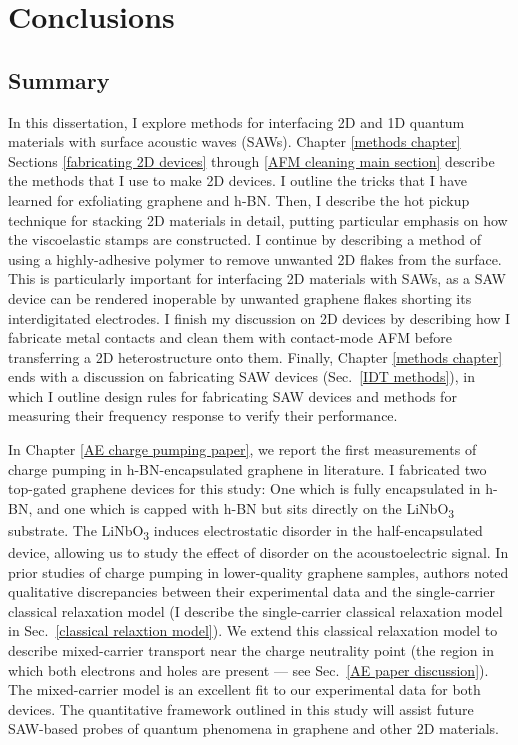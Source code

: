 \documentclass[double,12pt,1in,seploa]{beavtex}
\let\Oldsection\section
\renewcommand{\section}{\FloatBarrier\Oldsection}
\begin{document}
\chapter{Conclusions} \label{conclusions chapter}

\section{Summary}
In this dissertation, I explore methods for interfacing 2D and 1D quantum materials with surface acoustic waves (SAWs). Chapter \ref{methods chapter} Sections \ref{fabricating 2D devices} through \ref{AFM cleaning main section} describe the methods that I use to make 2D devices. I outline the tricks that I have learned for exfoliating graphene and h-BN. Then, I describe the hot pickup technique for stacking 2D materials in detail, putting particular emphasis on how the viscoelastic stamps are constructed. I continue by describing a method of using a highly-adhesive polymer to remove unwanted 2D flakes from the surface. This is particularly important for interfacing 2D materials with SAWs, as a SAW device can be rendered inoperable by unwanted graphene flakes shorting its interdigitated electrodes. I finish my discussion on 2D devices by describing how I fabricate metal contacts and clean them with contact-mode AFM before transferring a 2D heterostructure onto them. Finally, Chapter \ref{methods chapter} ends with a discussion on fabricating SAW devices (Sec.\ \ref{IDT methods}), in which I outline design rules for fabricating SAW devices and methods for measuring their frequency response to verify their performance.

In Chapter \ref{AE charge pumping paper}, we report the first measurements of charge pumping in h-BN-encapsulated graphene in literature. I fabricated two top-gated graphene devices for this study: One which is fully encapsulated in h-BN, and one which is capped with h-BN but sits directly on the LiNbO\textsubscript{3} substrate. The LiNbO\textsubscript{3} induces electrostatic disorder in the half-encapsulated device, allowing us to study the effect of disorder on the acoustoelectric signal. In prior studies of charge pumping in lower-quality graphene samples, authors noted qualitative discrepancies between their experimental data and the single-carrier classical relaxation model (I describe the single-carrier classical relaxation model in Sec.\ \ref{classical relaxtion model}). We extend this classical relaxation model to describe mixed-carrier transport near the charge neutrality point (the region in which both electrons and holes are present — see Sec.\ \ref{AE paper discussion}). The mixed-carrier model is an excellent fit to our experimental data for both devices. The quantitative framework outlined in this study will assist future SAW-based probes of quantum phenomena in graphene and other 2D materials.
\end{document}
